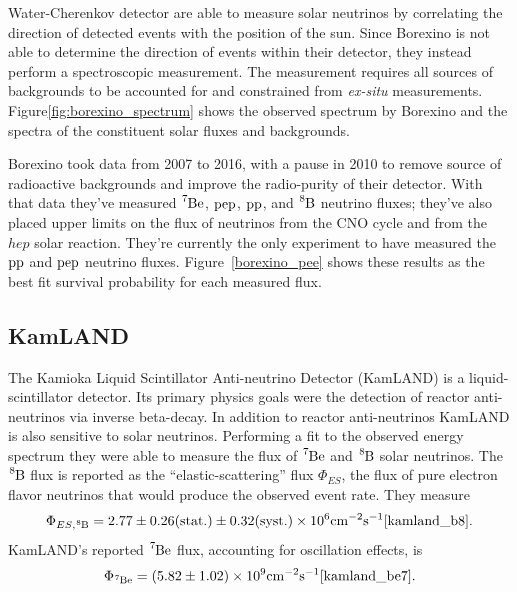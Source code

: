 Water-Cherenkov detector are able to measure solar neutrinos by correlating the
direction of detected events with the position of the sun. Since Borexino is not
able to determine the direction of events within their detector, they instead
perform a spectroscopic measurement. The measurement requires
all sources of backgrounds to be accounted for and constrained from \textit{ex-situ}
measurements. Figure\ref{fig:borexino_spectrum} shows the observed spectrum by Borexino and the
spectra of the constituent solar fluxes and backgrounds.

Borexino took data from 2007 to 2016, with a pause in 2010 to remove source
of radioactive backgrounds and improve the radio-purity of their detector.
With that data they've measured $\ce{^{7}Be}$, $\ce{pep}$, $\ce{pp}$, and $\ce{^{8}B}$ neutrino
fluxes; they've also placed upper limits on the flux
of neutrinos from the CNO cycle and from the $hep$ solar reaction.
They're currently the only experiment to have measured the $\ce{pp}$ and $\ce{pep}$ neutrino
fluxes.
Figure~\ref{borexino_pee} shows these results as the best fit survival probability
for each measured flux.


\subsection{KamLAND}
The Kamioka Liquid Scintillator Anti-neutrino Detector (KamLAND) is a liquid-scintillator detector.
Its primary physics goals were the detection of reactor anti-neutrinos via
inverse beta-decay.
In addition to reactor anti-neutrinos KamLAND is also sensitive to solar neutrinos.
Performing a fit to the observed energy spectrum they were able to measure
the flux of $\ce{^{7}Be}$ and $\ce{^{8}B}$ solar neutrinos.
The $\ce{^{8}B}$ flux is reported as the ``elastic-scattering'' flux $\Phi_{ES}$, the flux of
pure electron flavor neutrinos that would produce the observed event rate.
They measure 
\begin{equation*}
\Phi_{ES\mathrm{,}\ce{^{8}B}} = 2.77 \pm 0.26(\mathrm{stat.}) \pm 0.32(\mathrm{syst.}) \times 10^6 \mathrm{cm}^{-2}\mathrm{s}^{-1}\text{\cite{kamland_b8}}.
\end{equation*}
KamLAND's reported $\ce{^{7}Be}$ flux, accounting for oscillation effects,  is
\begin{equation*}
\Phi_{\ce{^{7}Be}} = (5.82\pm 1.02)\times10^{9} \mathrm{cm}^{-2}\mathrm{s}^{-1}\text{\cite{kamland_be7}.}
\end{equation*}


